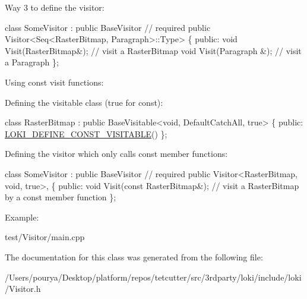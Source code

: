 Way 3 to define the visitor\+: 
\begin{DoxyCode}
\textcolor{keyword}{class }SomeVisitor : 
    \textcolor{keyword}{public} BaseVisitor \textcolor{comment}{// required}
    \textcolor{keyword}{public} Visitor<Seq<RasterBitmap, Paragraph>::Type>
\{
\textcolor{keyword}{public}:
    \textcolor{keywordtype}{void} Visit(RasterBitmap&); \textcolor{comment}{// visit a RasterBitmap}
    \textcolor{keywordtype}{void} Visit(Paragraph &);   \textcolor{comment}{// visit a Paragraph}
\};
\end{DoxyCode}


\begin{DoxyParagraph}{Using const visit functions\+:}

\end{DoxyParagraph}
Defining the visitable class (true for const)\+:


\begin{DoxyCode}
\textcolor{keyword}{class }RasterBitmap : \textcolor{keyword}{public} BaseVisitable<void, DefaultCatchAll, true>
\{
\textcolor{keyword}{public}:
    \hyperlink{group__VisitorGroup_ga0d60fea385397a82b9d3b3d231517777}{LOKI\_DEFINE\_CONST\_VISITABLE}()
\};
\end{DoxyCode}


Defining the visitor which only calls const member functions\+: 
\begin{DoxyCode}
\textcolor{keyword}{class }SomeVisitor : 
    \textcolor{keyword}{public} BaseVisitor \textcolor{comment}{// required}
    \textcolor{keyword}{public} Visitor<RasterBitmap, void, true>,
\{
\textcolor{keyword}{public}:
    \textcolor{keywordtype}{void} Visit(\textcolor{keyword}{const} RasterBitmap&); \textcolor{comment}{// visit a RasterBitmap by a const member function}
\};
\end{DoxyCode}


\begin{DoxyParagraph}{Example\+:}

\end{DoxyParagraph}
test/\+Visitor/main.\+cpp 

The documentation for this class was generated from the following file\+:\begin{DoxyCompactItemize}
\item 
/\+Users/pourya/\+Desktop/platform/repos/tetcutter/src/3rdparty/loki/include/loki/Visitor.\+h\end{DoxyCompactItemize}
